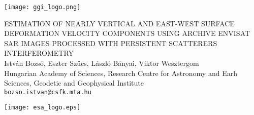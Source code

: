 \documentclass[a0, portrait]{a0poster}
\begin{document}

\bfseries

\begin{mdframed}[style=title]
    \hspace{25pt}
    \begin{minipage}[c]{0.2\textwidth}
        \texttt{[image: ggi\_logo.png]}
    \end{minipage}
    \hspace{-50pt}
    \begin{minipage}[c]{0.6\textwidth}
      \Large {\color{blue!30!black} ESTIMATION OF NEARLY VERTICAL AND EAST-WEST SURFACE DEFORMATION VELOCITY COMPONENTS USING ARCHIVE ENVISAT SAR IMAGES PROCESSED WITH PERSISTENT SCATTERERS INTERFEROMETRY}\\[25pt] %
    István Bozsó, Eszter Szűcs, László Bányai, Viktor Wesztergom \\[10pt]%
     \large \normalfont Hungarian Academy of Sciences, Research Centre for Astronomy and Earh Sciences, Geodetic and Geophysical Institute\\[10pt] %
    \Large \texttt{bozso.istvan@csfk.mta.hu}
    \end{minipage}
    \hspace{50pt}
    \begin{minipage}[c]{0.2\textwidth}
        \texttt{[image: esa\_logo.eps]}
    \end{minipage}
\end{mdframed}

\small


\vspace{50pt}
\end{document}
